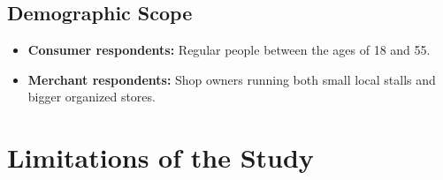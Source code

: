 \subsection{Demographic Scope}

\begin{itemize}
    \item \textbf{Consumer respondents:} Regular people between the ages of 18 and 55.
    \item \textbf{Merchant respondents:} Shop owners running both small local stalls and bigger organized stores.
\end{itemize}

\section{Limitations of the Study}

